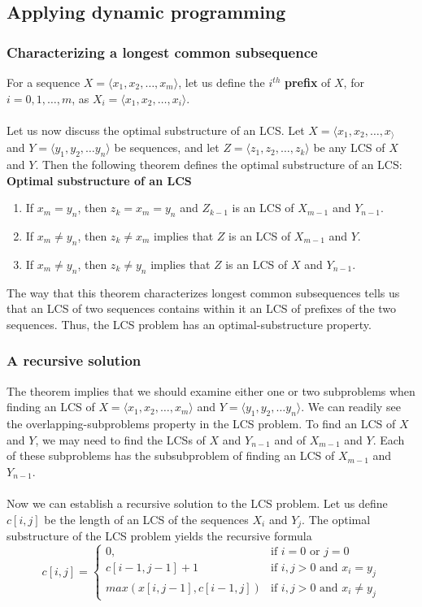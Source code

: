 \documentclass[a4paper]{article}
\begin{document}
\subsection{Applying dynamic programming}
\subsubsection{Characterizing a longest common subsequence}
For a sequence $X=\langle x_1, x_2,\dots,x_m\rangle$, let us define the $i^{th}$ \textbf{prefix} of $X$, for $i=0,1,\dots,m$, as $X_i = \langle x_1, x_2, \dots, x_i\rangle$.\\ \\
Let us now discuss the optimal substructure of an LCS. Let $X = \langle x_1, x_2, \dots, x_\rangle$ and $Y = \langle y_1, y_2, \dots y_n \rangle$ be sequences, and let $Z = \langle z_1, z_2, \dots, z_k\rangle$ be any LCS of $X$ and $Y$. Then the following theorem defines the optimal substructure of an LCS:
\textbf{Optimal substructure of an LCS}
\begin{enumerate}
	\item If $x_m = y_n$, then $z_k = x_m = y_n$ and $Z_{k-1}$ is an LCS of $X_{m-1}$ and $Y_{n-1}$.
	\item If $x_m \neq y_n$, then $z_k \neq x_m$ implies that $Z$ is an LCS of $X_{m-1}$ and $Y$.
	\item If $x_m \neq y_n$, then $z_k \neq y_n$ implies that $Z$ is an LCS of $X$ and $Y_{n-1}$.
\end{enumerate}
The way that this theorem characterizes longest common subsequences tells us that an LCS of two sequences contains within it an LCS of prefixes of the two sequences. Thus, the LCS problem has an optimal-substructure property.
\subsubsection{A recursive solution}
The theorem implies that we should examine either one or two subproblems when finding an LCS of $X=\langle x_1, x_2,\dots,x_m\rangle$ and $Y = \langle y_1, y_2, \dots y_n \rangle$. We can readily see the overlapping-subproblems property in the LCS problem. To find an LCS of $X$ and $Y$, we may need to find the LCSs of $X$ and $Y_{n-1}$ and of $X_{m-1}$ and $Y$. Each of these subproblems has the subsubproblem of finding an LCS of $X_{m-1}$ and $Y_{n-1}$.\\ \\
Now we can establish a recursive solution to the LCS problem. Let us define $c[i,j]$ be the length of an LCS of the sequences $X_i$ and $Y_j$. The optimal substructure of the LCS problem yields the recursive formula
\[
c[i,j]=
\begin{cases}
0, & \text{if } i=0 \text{ or } j=0\\
c[i-1, j-1] + 1 & \text{if } i,j > 0 \text{ and } x_i = y_j\\
max(x[i,j-1], c[i-1,j]) & \text{if } i,j>0 \text{ and } x_i \neq y_j
\end{cases}
\]
\end{document}
